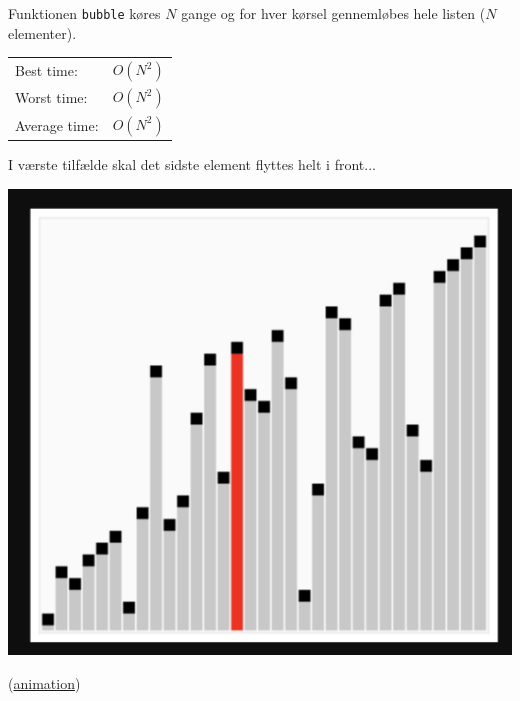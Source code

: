 \documentclass[rgb]{beamer}
\begin{document}
\begin{frame}[fragile]
\begin{footnotesize}


\vspace{1ex}

\begin{minipage}[b]{0.55\textwidth}

  Funktionen \lstinline{bubble} køres $N$ gange og for hver kørsel
  gennemløbes hele listen ($N$ elementer).

\vspace{1ex}


\vspace{1ex}
  \begin{tabular}{ll}
    Best time: & $O(N^2)$ \\
    Worst time: & $O(N^2)$ \\
    Average time: & $O(N^2)$
  \end{tabular}

  \vspace{1ex}
  I værste tilfælde skal det sidste element flyttes helt i front...
  \vfill
\mbox{ }
\end{minipage} \hspace{1cm}
\begin{minipage}[b]{0.3\textwidth}

  \includegraphics[width=\textwidth]{../images/bsort_gif.png}

  (\href{https://upload.wikimedia.org/wikipedia/commons/5/54/Sorting_bubblesort_anim.gif}{animation})
\end{minipage}

\end{footnotesize}
\end{frame}
\end{document}
